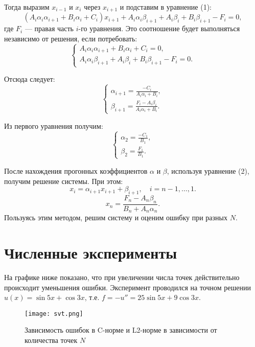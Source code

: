 \documentclass[a4paper,12pt,titlepage,final]{article}
\begin{document}
Тогда выразим \( x_{i-1} \) и \( x_i \) через \( x_{i+1} \) и подставим в уравнение (1):
\begin{equation}
    (A_i \alpha_i \alpha_{i+1} + B_i \alpha_i + C_i) x_{i+1} + A_i \alpha_i \beta_{i+1} + A_i \beta_i + B_i \beta_{i+1} - F_i = 0,
\end{equation}
где \( F_i \) — правая часть \( i \)-го уравнения. Это соотношение будет выполняться независимо от решения, если потребовать:
\begin{equation}
    \begin{cases}
        A_i \alpha_i \alpha_{i+1} + B_i \alpha_i + C_i = 0, \\
        A_i \alpha_i \beta_{i+1} + A_i \beta_i + B_i \beta_{i+1} - F_i = 0.
    \end{cases}
\end{equation}

Отсюда следует:
\begin{equation}
    \begin{cases}
        \alpha_{i+1} = \frac{-C_i}{A_i \alpha_i + B_i}, \\
        \beta_{i+1} = \frac{F_i - A_i \beta_i}{A_i \alpha_i + B_i}.
    \end{cases}
\end{equation}

Из первого уравнения получим:
\begin{equation}
    \begin{cases}
        \alpha_2 = \frac{-C_1}{B_1}, \\
        \beta_2 = \frac{F_1}{B_1}.
    \end{cases}
\end{equation}

После нахождения прогонных коэффициентов \( \alpha \) и \( \beta \), используя уравнение (2), получим решение системы. При этом:
\begin{equation}
    x_i = \alpha_{i+1} x_{i+1} + \beta_{i+1}, \quad i = n-1, \dots, 1.
\end{equation}
\begin{equation}
    x_n = \frac{F_n - A_n \beta_n}{B_n + A_n \alpha_n}.
\end{equation}
Пользуясь этим методом, решим систему и оценим ошибку при разных $N$.
\section{Численные эксперименты}
На графике ниже показано, что при увеличении числа точек действительно происходит уменьшения ошибки. Эксперимент проводился на точном решении $u(x) = \sin5x + \cos3x$, т.е. $f = -u'' =25\sin5x + 9\cos3x$.
\begin{figure}[H]
    \centering
    \texttt{[image: svt.png]}
    \caption{Зависимость ошибок в C-норме и L2-норме в зависимости от количества точек $N$}
    \label{fig:svt}
\end{figure}
\end{document}

